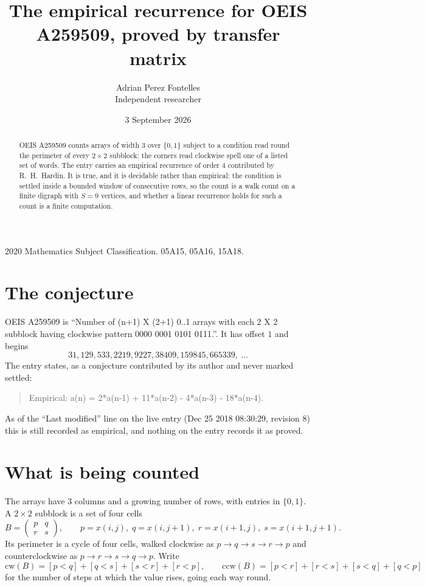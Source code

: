 \documentclass[11pt,a4paper]{article}
\title{The empirical recurrence for OEIS A259509, proved by transfer matrix}
\author{Adrian Perez Fontelles\\ \small Independent researcher}
\date{3 September 2026}
\theoremstyle{plain}
\theoremstyle{definition}
\begin{document}
\maketitle

\begin{abstract}
OEIS A259509 counts arrays of width $3$ over $\{0,1\}$ subject to a condition read round the
perimeter of every $2\times2$ subblock: the corners read clockwise spell one of a listed set of words. The entry carries an empirical recurrence of
order $4$ contributed by R.~H.~Hardin. It is true, and it is decidable rather than
empirical: the condition is settled inside a bounded window of consecutive rows, so the
count is a walk count on a finite digraph with $S=9$ vertices, and whether a linear
recurrence holds for such a count is a finite computation.
\end{abstract}

\noindent\small 2020 Mathematics Subject Classification. 05A15, 05A16, 15A18.\normalsize

\section{The conjecture}

OEIS A259509 is ``Number of (n+1) X (2+1) 0..1 arrays with each 2 X 2 subblock having clockwise pattern 0000 0001 0101 0111.''. It has offset $1$ and begins
\[
31, 129, 533, 2219, 9227, 38409, 159845, 665339,\ \dots
\]
The entry states, as a conjecture contributed by its author and never marked settled:
\begin{quote}
Empirical: a(n) = 2*a(n-1) + 11*a(n-2) - 4*a(n-3) - 18*a(n-4).
\end{quote}
As of the ``Last modified'' line on the live entry (Dec 25 2018 08:30:29, revision 8) this is still
recorded as empirical, and nothing on the entry records it as proved.

\section{What is being counted}

The arrays have $3$ columns and a growing number of rows, with entries in $\{0,1\}$. A
$2\times2$ subblock is a set of four cells
\[
B=\begin{pmatrix} p & q \\ r & s \end{pmatrix},
\qquad p=x(i,j),\; q=x(i,j+1),\; r=x(i+1,j),\; s=x(i+1,j+1).
\]
Its perimeter is a cycle of four cells, walked clockwise as $p\to q\to s\to r\to p$ and
counterclockwise as $p\to r\to s\to q\to p$. Write
\[
\mathrm{cw}(B)=[p<q]+[q<s]+[s<r]+[r<p],\qquad
\mathrm{ccw}(B)=[p<r]+[r<s]+[s<q]+[q<p]
\]
for the number of steps at which the value rises, going each way round.
\end{document}

